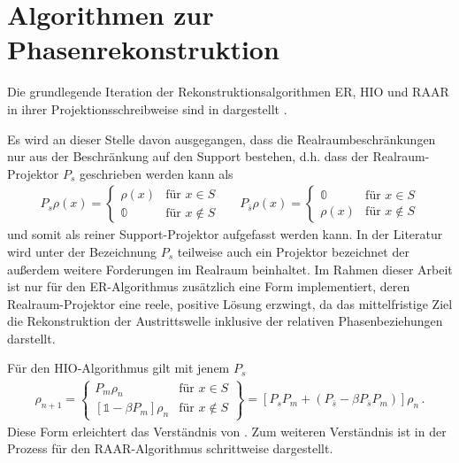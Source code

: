 \chapter{Algorithmen zur Phasenrekonstruktion}
\label{app:algos}
Die grundlegende Iteration der Rekonstruktionsalgorithmen ER, HIO und RAAR in ihrer Projektionsschreibweise sind in  dargestellt \cite{fienup1978,luke2004,marchesini2007}.

Es wird an dieser Stelle davon ausgegangen, dass die Realraumbeschränkungen nur aus der Beschränkung auf den Support bestehen, d.h. dass der Realraum-Projektor $P_s$ geschrieben werden kann als 
\begin{align}
	P_s\rho (x)=\begin{cases}
	\rho (x)  &\text{für } x\in S\\
	\mathbb{0}  &\text{für }x\notin S
	\end{cases} &   &   
	P_{\bar{s}}\rho (x)=\begin{cases}
	\mathbb{0} &\text{für } x\in S\\
	\rho (x)   &\text{für }x\notin S
	\end{cases}
\end{align}
und somit als reiner Support-Projektor aufgefasst werden kann. In der Literatur wird unter der Bezeichnung $P_s$ teilweise auch ein Projektor bezeichnet der außerdem weitere Forderungen im Realraum beinhaltet. Im Rahmen dieser Arbeit ist nur für den ER-Algorithmus zusätzlich eine Form implementiert, deren Realraum-Projektor eine reele, positive Lösung erzwingt, da das mittelfristige Ziel die Rekonstruktion der Austrittswelle inklusive der relativen Phasenbeziehungen darstellt.
 
Für den HIO-Algorithmus gilt mit jenem $P_s$ 
\begin{align}
	\rho_{n+1}=\left.
	\begin{cases}	
	P_m\rho_n                               & \text{für } x\in S    \\
	\left[\mathbb{1}-\beta P_m\right]\rho_n & \text{für } x\notin S 
	\end{cases}	
	\right\}=\left[P_sP_m+\left(P_{\bar{s}}-\beta P_{\bar{s}} P_m\right)\right]\rho_n
	\,.
\end{align}
Diese Form erleichtert das Verständnis von . Zum weiteren Verständnis ist in  der Prozess für den RAAR-Algorithmus schrittweise dargestellt.
	
